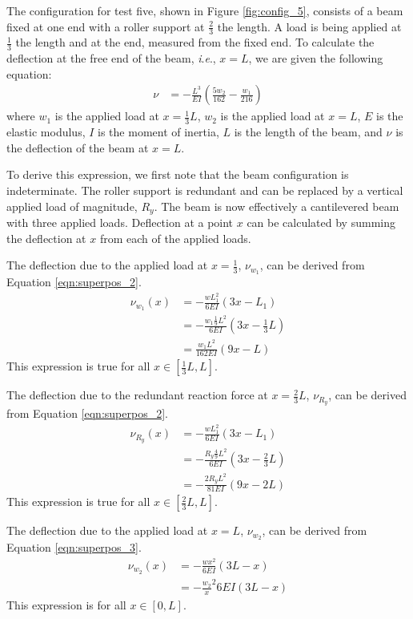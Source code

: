 \documentclass[12 pt]{article}
\newcommand{\ie}{\textit{i}.\textit{e}., }
\begin{document}
The configuration for test five, shown in Figure \ref{fig:config_5}, consists of a beam fixed at one end with a roller support at $\frac{2}{3}$ the length. A load is being applied at $\frac{1}{3}$ the length and at the end, measured from the fixed end. To calculate the deflection at the free end of the beam, \ie $x=L$, we are given the following equation:
\begin{align} \label{eqn:config_5-deflection}
	\nu&=-\frac{L^3}{EI}\left(\frac{5w_2}{162}-\frac{w_1}{216}\right)
\end{align}
where $w_1$ is the applied load at $x=\frac{1}{3}L$, $w_2$ is the applied load at $x=L$, $E$ is the elastic modulus, $I$ is the moment of inertia, $L$ is the length of the beam, and $\nu$ is the deflection of the beam at $x=L$.

To derive this expression, we first note that the beam configuration is indeterminate. The roller support is redundant and can be replaced by a vertical applied load of magnitude, $R_y$. The beam is now effectively a cantilevered beam with three applied loads. Deflection at a point $x$ can be calculated by summing the deflection at $x$ from each of the applied loads.

The deflection due to the applied load at $x=\frac{1}{3}$, $\nu_{w_1}$, can be derived from Equation \ref{eqn:superpos_2}.
\begin{align*}
	\nu_{w_1}(x)&=-\frac{wL_1^2}{6EI}(3x-L_1)\\
	&=-\frac{w_1\frac{1}{9}L^2}{6EI}(3x-\frac{1}{3}L)\\
	&=\frac{w_1L^2}{162EI}(9x-L)
\end{align*}
This expression is true for all $x\in[\frac{1}{3}L,L]$.

The deflection due to the redundant reaction force at $x=\frac{2}{3}L$, $\nu_{R_y}$, can be derived from Equation \ref{eqn:superpos_2}.
\begin{align*}
	\nu_{R_y}(x)&=-\frac{wL_1^2}{6EI}(3x-L_1)\\
	&=-\frac{R_y\frac{4}{9}L^2}{6EI}(3x-\frac{2}{3}L)\\
	&=-\frac{2R_yL^2}{81EI}(9x-2L)
\end{align*}
This expression is true for all $x\in[\frac{2}{3}L,L]$.

The deflection due to the applied load at $x=L$, $\nu_{w_2}$, can be derived from Equation \ref{eqn:superpos_3}.
\begin{align*}
	\nu_{w_2}(x)&=-\frac{wx^2}{6EI}(3L-x)\\
	&=-\frac{w_2}x^2{6EI}(3L-x)
\end{align*}
This expression is for all $x\in[0,L]$.
\end{document}
